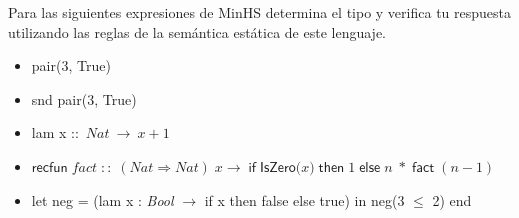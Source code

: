     \begin{exercise}
        Para las siguientes expresiones de \textsf{MinHS} determina el tipo y verifica tu respuesta utilizando las reglas de la semántica estática de este lenguaje.\\
        
        \begin{itemize}
            \item \textsf{pair(3, True)}
            \item \textsf{snd pair(3, True)}
            \item \textsf{lam} x ::\ $\textit{Nat}\ \rightarrow\ x +1$  
            \item  \textsf{$ \textsf{recfun}\; \textit{fact}\; ::\; (\textit{Nat} \Rightarrow \textit{Nat})\; x \rightarrow\; \textsf{if}\; \textsf{IsZero($x$)}\; \textsf{then}\; 1\; \textsf{else}\; n\; *\; \textsf{fact}\; (n-1)$}
		\item \textsf{let} neg = (\textsf{lam} x : \textit{Bool} $\rightarrow$ \textsf{if } x \textsf{then } false \textsf{else} true) \textsf{in} neg(3 $\leq$ 2) \textsf{end}
        \end{itemize}
    \end{exercise}

\bigskip

